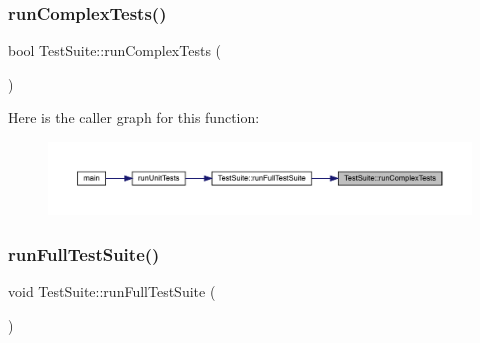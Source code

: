 \subsubsection{\texorpdfstring{runComplexTests()}{runComplexTests()}}
{\footnotesize\ttfamily bool Test\+Suite\+::run\+Complex\+Tests (\begin{DoxyParamCaption}{ }\end{DoxyParamCaption})}

Here is the caller graph for this function\+:
\nopagebreak
\begin{figure}[H]
\begin{center}
\leavevmode
\includegraphics[width=350pt]{class_test_suite_a0597dcd7c68390ac33d8095f2a76ae0f_icgraph}
\end{center}
\end{figure}
\mbox{\label{class_test_suite_a0fa7e788a1b1c235faa475c0d1aaa1e3}} 
\subsubsection{\texorpdfstring{runFullTestSuite()}{runFullTestSuite()}}
{\footnotesize\ttfamily void Test\+Suite\+::run\+Full\+Test\+Suite (\begin{DoxyParamCaption}{ }\end{DoxyParamCaption})}

